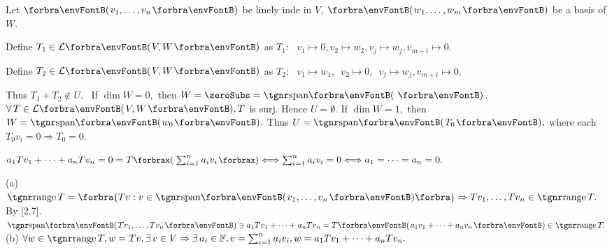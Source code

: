 \par\quad
Let $\Par{v_1,\dots,v_n}$ be linely inde in $V$, $\Par{w_1,\dots,w_m}$ be a basis of $W$. \par\quad
Define $T_1\in\Lm{V,W}$ as $T_1:\,\,\,\,v_1\mapsto 0,$\qquad$v_2\mapsto w_2,$\qquad$v_j\mapsto w_j,$\qquad$v_{m+i}\mapsto 0.$\par\quad
Define $T_2\in\Lm{V,W}$ as $T_2:\,\,\,\,v_1\mapsto w_1,$\,\,\,\quad$v_2\mapsto 0,$\,\,\,\qquad$v_j\mapsto w_j,$\qquad$v_{m+i}\mapsto 0.$\par\quad
{} Thus $T_1+T_2\not\in U.$\PfEnd\vspace{2pt}
\Comment \,\,\,If $\dim W=0,$ then $W=\zeroSubs=\Span{\,}$. $\forall\,T\in\Lm{V,W}, T$ is surj. Hence $U=\emptyset.$\parCom
If $\dim W=1,$ then $W=\Span{w_0}.$ Thus $U=\Span{T_0},$ where each $T_0v_i=0\Rightarrow T_0=0.$\SepLine

$a_1 Tv_1+\dots+a_n Tv_n=0=T\XPar{\sum_{i=1}^n a_i v_i}\Longleftrightarrow \sum_{i=1}^n a_i v_i=0\Longleftrightarrow a_1=\dots=a_n=0.$\PfEnd
\SepLine

 {
}(a) $\range T=\Bra{Tv:v\in\Span{v_1,\dots,v_n}}\Rightarrow Tv_1,\dots,Tv_n\in\range T.$ By [2.7].\parSol{\Ha}
\Or $\Span{Tv_1,\dots,Tv_n}\ni a_1 Tv_1+\dots+a_n Tv_n=T\Par{a_1 v_1+\dots+a_n v_n}\in\range T.$\parSol{}
(b) $\forall w\in\range T,w=Tv,\exists\,v\in V\Rightarrow\exists\,a_i\in\Fbb,v=\sum_{i=1}^na_i v_i,w=a_1 Tv_1+\dots+a_n Tv_n.$\PfEnd
\SepLine


